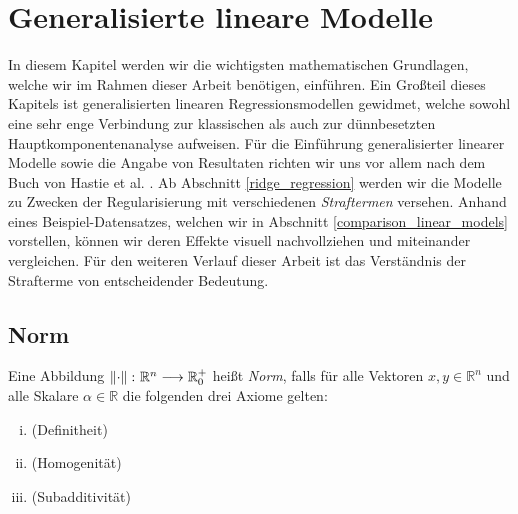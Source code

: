 \chapter{Generalisierte lineare Modelle}

\label{fundamentals}

In diesem Kapitel werden wir die wichtigsten mathematischen Grundlagen, welche wir im Rahmen dieser Arbeit benötigen, einführen. Ein Großteil dieses Kapitels ist generalisierten linearen Regressionsmodellen gewidmet, welche sowohl eine sehr enge Verbindung zur klassischen als auch zur dünnbesetzten Hauptkomponentenanalyse aufweisen. Für die Einführung generalisierter linearer Modelle sowie die Angabe von Resultaten richten wir uns vor allem nach dem Buch von Hastie et al. \cite{hastie_elements}. Ab Abschnitt \ref{ridge_regression} werden wir die Modelle zu Zwecken der Regularisierung mit verschiedenen \textit{Straftermen} versehen. Anhand eines Beispiel-Datensatzes, welchen wir in Abschnitt \ref{comparison_linear_models} vorstellen, können wir deren Effekte visuell nachvollziehen und miteinander vergleichen. Für den weiteren Verlauf dieser Arbeit ist das Verständnis der Strafterme von entscheidender Bedeutung.




\section{Norm}

\begin{defn}
\label{norm}
Eine Abbildung $\left\lVert \cdot \right\rVert \colon \mathbb{R}^n \longrightarrow {\mathbb {R} }_{0}^{+}$ heißt \textit{Norm}, falls für alle Vektoren $x,y\in \mathbb{R}^n$ und alle Skalare $\alpha \in \mathbb{R}$ die folgenden drei Axiome gelten:
\begin{enumerate}[(i)]
\item {}(Definitheit)
\item {}(Homogenität)
\item {}(Subadditivität)
\end{enumerate}
\end{defn}

